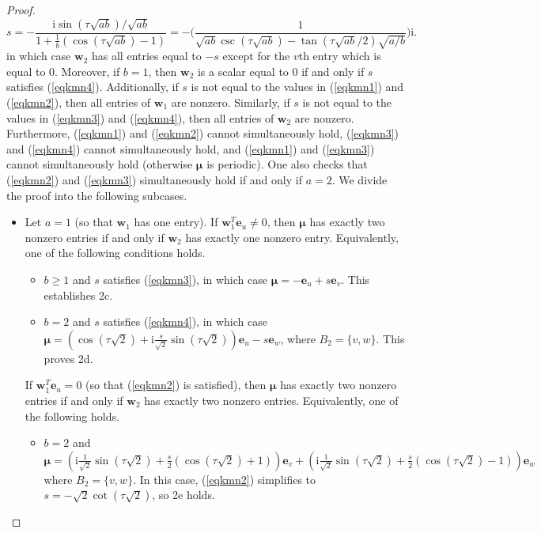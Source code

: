 \documentclass{article}
\numberwithin{equation}{section}
\newcommand{\be}{\mathbf e}
\newcommand{\bw}{\mathbf w}
\newcommand{\bmu}{{\boldsymbol{\mu}}}
\def\ii{\mathrm{i}}
\begin{document}
{\begin{proof}
\begin{equation}
\label{eqkmn4}
s=-\frac{\ii\sin(\tau\sqrt{ab})/\sqrt{ab}}{1+\frac{1}{b}(\cos(\tau\sqrt{ab})-1)}=-\bigg(\frac{1}{\sqrt{ab}\csc(\tau\sqrt{ab})-\tan(\tau\sqrt{ab}/2)\sqrt{a/b}}\bigg)\ii.
\end{equation}
in which case $\bw_2$ has all entries equal to $-s$ 
except for the $v$th entry which is equal to 0. Moreover, if $b=1$, then $\bw_2$ is a scalar equal to 0 if and only if $s$ satisfies (\ref{eqkmn4}).
Additionally, if $s$ is not equal to the values in (\ref{eqkmn1}) and (\ref{eqkmn2}), then all entries of $\bw_1$ are nonzero. Similarly, if $s$ is not equal to the values in (\ref{eqkmn3}) and (\ref{eqkmn4}), then all entries of $\bw_2$ are nonzero. Furthermore, (\ref{eqkmn1}) and (\ref{eqkmn2}) cannot simultaneously hold, (\ref{eqkmn3}) and (\ref{eqkmn4}) cannot simultaneously hold, and (\ref{eqkmn1}) and (\ref{eqkmn3}) cannot simultaneously hold (otherwise $\bmu$ is periodic). One also checks that (\ref{eqkmn2}) and (\ref{eqkmn3}) simultaneously hold if and only if $a=2$. We divide the proof into the following subcases.
\begin{itemize}
\item Let $a=1$ (so that $\bw_1$ has one entry). If $\bw_1^T\be_u\neq 0$, then $\bmu$ has exactly two nonzero entries if and only if $\bw_2$ has exactly one nonzero entry. Equivalently, one of the following conditions holds.
\begin{itemize}
\item $b\geq 1$ and $s$ satisfies (\ref{eqkmn3}), in which case $\bmu=-\be_u+s\be_v$. This establishes 2c.
\item $b=2$ and $s$ satisfies (\ref{eqkmn4}), in which case $\bmu=\left(\cos( \tau\sqrt{2})+\ii \frac{s}{\sqrt{2}}\sin(\tau\sqrt{2})\right)\be_u -s\be_w$, where $B_2=\{v,w\}$. This proves 2d.
\end{itemize}
If $\bw_1^T\be_u=0$ (so that (\ref{eqkmn2}) is satisfied), then $\bmu$ has exactly two nonzero entries if and only if $\bw_2$ has exactly two nonzero entries. Equivalently, one of the following holds.
\begin{itemize}
\item $b=2$ and $\bmu=\left(\ii\frac{1}{\sqrt{2}}\sin(\tau\sqrt{2})+\frac{s}{2}(\cos(\tau\sqrt{2})+1)\right)\be_v+\left(\ii\frac{1}{\sqrt{2}}\sin(\tau\sqrt{2})+\frac{s}{2}(\cos(\tau\sqrt{2})-1)\right)\be_w$ where $B_2=\{v,w\}$. In this case, (\ref{eqkmn2}) simplifies to $s=-\sqrt{2}\cot(\tau\sqrt{2})$, so 2e holds.

\end{itemize}
\end{itemize}
\end{proof}}
\end{document}

